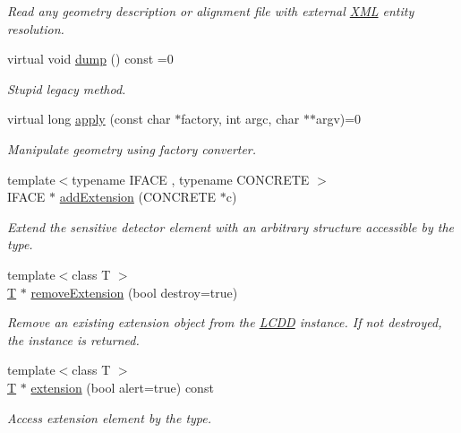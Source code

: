 \begin{DoxyCompactItemize}
\begin{DoxyCompactList}\small\item\em Read any geometry description or alignment file with external \hyperlink{namespace_d_d4hep_1_1_x_m_l}{XML} entity resolution. \item\end{DoxyCompactList}\item 
virtual void \hyperlink{class_d_d4hep_1_1_geometry_1_1_l_c_d_d_aa67b3fbf93d48e08c08b60cdd83b729f}{dump} () const =0
\begin{DoxyCompactList}\small\item\em Stupid legacy method. \item\end{DoxyCompactList}\item 
virtual long \hyperlink{class_d_d4hep_1_1_geometry_1_1_l_c_d_d_ab47f82e5a5bfda6f58624b3553a08c68}{apply} (const char $\ast$factory, int argc, char $\ast$$\ast$argv)=0
\begin{DoxyCompactList}\small\item\em Manipulate geometry using factory converter. \item\end{DoxyCompactList}\item 
{\footnotesize template$<$typename IFACE , typename CONCRETE $>$ }\\IFACE $\ast$ \hyperlink{class_d_d4hep_1_1_geometry_1_1_l_c_d_d_a48b0708471772f0a63461840319e12ed}{addExtension} (CONCRETE $\ast$c)
\begin{DoxyCompactList}\small\item\em Extend the sensitive detector element with an arbitrary structure accessible by the type. \item\end{DoxyCompactList}\item 
{\footnotesize template$<$class T $>$ }\\\hyperlink{class_t}{T} $\ast$ \hyperlink{class_d_d4hep_1_1_geometry_1_1_l_c_d_d_a9ddb061fc3a827afe0349e3a841ea885}{removeExtension} (bool destroy=true)
\begin{DoxyCompactList}\small\item\em Remove an existing extension object from the \hyperlink{class_d_d4hep_1_1_geometry_1_1_l_c_d_d}{LCDD} instance. If not destroyed, the instance is returned. \item\end{DoxyCompactList}\item 
{\footnotesize template$<$class T $>$ }\\\hyperlink{class_t}{T} $\ast$ \hyperlink{class_d_d4hep_1_1_geometry_1_1_l_c_d_d_aac5486912a4f88cbad59f6e0ec137289}{extension} (bool alert=true) const 
\begin{DoxyCompactList}\small\item\em Access extension element by the type. \item\end{DoxyCompactList}\end{DoxyCompactItemize}
